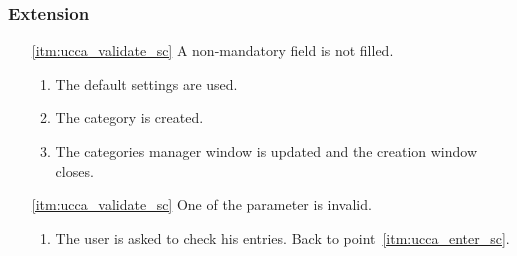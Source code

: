 \subsubsection{Extension}
\begin{enumerate}
	\item[\ref{itm:ucca_validate_sc}] A non-mandatory field is not filled.
	\begin{enumerate}[i]
		\item The default settings are used. 
		\item The category is created.
		\item The categories manager window is updated and the creation window closes.
	\end{enumerate}
	
	\item[\ref{itm:ucca_validate_sc}] One of the parameter is invalid.
	\begin{enumerate}[i]
		\item The user is asked to check his entries. Back to point~\ref{itm:ucca_enter_sc}.
	\end{enumerate}
\end{enumerate}